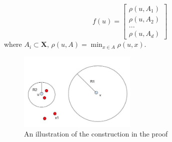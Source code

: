 \[
f(u)=
\begin{bmatrix}
    \rho (u,A_1)\\
    \rho (u,A_2)\\
    ...\\
    \rho (u,A_d)
\end{bmatrix}
\]
where $A_i \subset \mathbf{X}$, $\rho (u,A) = \min_{x \in A} \rho(u,x)$.

\begin{figure}[h!]
\begin{center}
\includegraphics[width=0.5\textwidth]{chapter_5/files/construction.jpg}
\caption{An illustration of the construction in the proof}
\end{center}
\end{figure}

